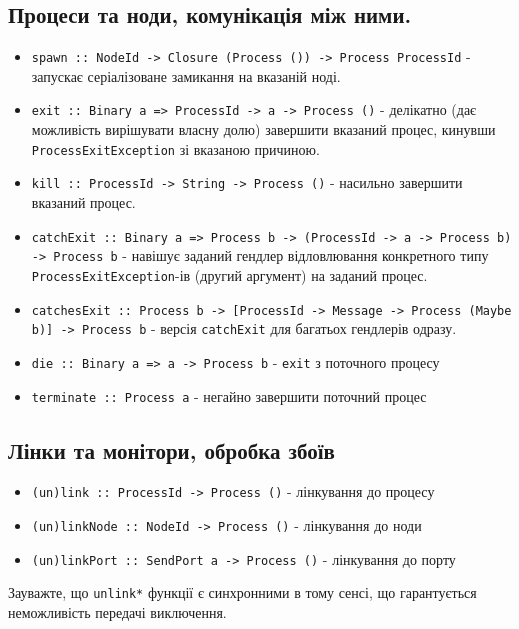 \documentclass[12pt]{article}
\begin{document}
\subsection{Процеси та ноди, комунікація між ними.}

\begin{itemize}
    \item \lstinline{spawn :: NodeId -> Closure (Process ()) -> Process ProcessId} - запускає серіалізоване замикання на вказаній ноді.
    \item \lstinline{exit :: Binary a => ProcessId -> a -> Process ()} - делікатно (дає можливість вирішувати власну долю) завершити вказаний процес, кинувши \lstinline{ProcessExitException} зі вказаною причиною. 
    \item \lstinline{kill :: ProcessId -> String -> Process ()} - насильно завершити вказаний процес.
    \item \lstinline{catchExit :: Binary a => Process b -> (ProcessId -> a -> Process b) -> Process b} - навішує заданий гендлер відловлювання конкретного типу \lstinline{ProcessExitException}-ів (другий аргумент) на заданий процес.
    \item \lstinline{catchesExit :: Process b -> [ProcessId -> Message -> Process (Maybe b)] -> Process b} - версія \lstinline{catchExit} для багатьох гендлерів одразу.
    \item \lstinline{die :: Binary a => a -> Process b} - \lstinline{exit} з поточного процесу
    \item \lstinline{terminate :: Process a} - негайно завершити поточний процес
\end{itemize}

\subsection{Лінки та монітори, обробка збоїв}

\begin{itemize}
    \item \lstinline{(un)link :: ProcessId -> Process ()} - лінкування до процесу
    \item \lstinline{(un)linkNode :: NodeId -> Process ()} - лінкування до ноди
    \item \lstinline{(un)linkPort :: SendPort a -> Process ()} - лінкування до порту
\end{itemize}

Зауважте, що \lstinline{unlink*} функції є синхронними в тому сенсі, що гарантується неможливість передачі виключення.
\end{document}
